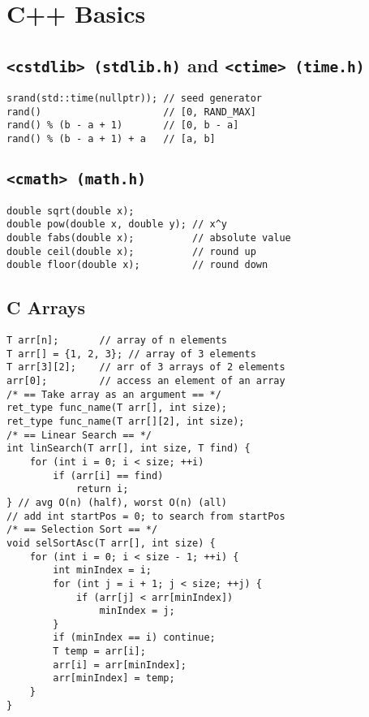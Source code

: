 \section{C++ Basics}

\subsection*{\texttt{<cstdlib> (stdlib.h)} and \texttt{<ctime> (time.h)}}

\begin{verbatim}
srand(std::time(nullptr)); // seed generator
rand()                     // [0, RAND_MAX]
rand() % (b - a + 1)       // [0, b - a]
rand() % (b - a + 1) + a   // [a, b]
\end{verbatim}
\vspace*{-1.5\baselineskip}

\subsection*{\texttt{<cmath> (math.h)}}

\begin{verbatim}
double sqrt(double x);
double pow(double x, double y); // x^y
double fabs(double x);          // absolute value
double ceil(double x);          // round up
double floor(double x);         // round down
\end{verbatim}
\vspace*{-1.25\baselineskip}

\subsection*{C Arrays}

\begin{verbatim}
T arr[n];       // array of n elements
T arr[] = {1, 2, 3}; // array of 3 elements
T arr[3][2];    // arr of 3 arrays of 2 elements
arr[0];         // access an element of an array
/* == Take array as an argument == */
ret_type func_name(T arr[], int size);
ret_type func_name(T arr[][2], int size);
/* == Linear Search == */
int linSearch(T arr[], int size, T find) {
    for (int i = 0; i < size; ++i)
        if (arr[i] == find)
            return i;
} // avg O(n) (half), worst O(n) (all)
// add int startPos = 0; to search from startPos
/* == Selection Sort == */
void selSortAsc(T arr[], int size) {
    for (int i = 0; i < size - 1; ++i) {
        int minIndex = i;
        for (int j = i + 1; j < size; ++j) {
            if (arr[j] < arr[minIndex])
                minIndex = j;
        }
        if (minIndex == i) continue;
        T temp = arr[i];
        arr[i] = arr[minIndex];
        arr[minIndex] = temp;
    }
}
\end{verbatim}
\vspace*{-1.25\baselineskip}

